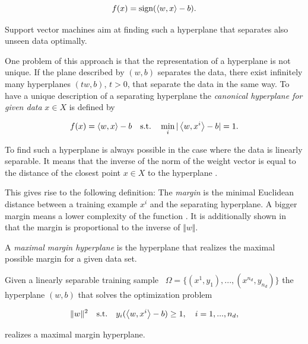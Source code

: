 \[ f(x) = \text{sign}(\left\langle w,x\right\rangle-b). \]

Support vector machines aim at finding such a hyperplane that separates also unseen data optimally.


One problem of this approach is that the representation of a hyperplane is not unique. If the plane described by \((w,b)\) separates the data, there exist infinitely many hyperplanes \((tw,b)\), \(t>0\), that separate the data in the same way.
To have a unique description of a separating hyperplane the \emph{canonical hyperplane for given data} \(x \in X\) is defined by
 
\[ f(x) = \left\langle w, x\right\rangle - b  \quad \text{s.t.} \quad \min_i \vert\left\langle w,x^i\right\rangle -b\vert = 1.\] 

To find such a hyperplane is always possible in the case where the data is  linearly separable. It means that the inverse of the norm of the weight vector is equal to the distance of the closest point \(x \in X \) to  the hyperplane \cite[p. 10]{Kunapuli2008}.



This gives rise to the following definition:
The \emph{margin} is the minimal Euclidean distance between a training example \(x^i\) and the separating hyperplane.
A bigger margin means a lower complexity of the function \cite{Cristianini2000}. It is additionally shown in \cite[p. 10]{Kunapuli2008} that the margin is proportional to the inverse of \(\Vert w \Vert\).

A \emph{maximal margin hyperplane} is the hyperplane that realizes the maximal possible margin for a given data set.

\begin{proposition}
Given a linearly separable training sample \ \(\Omega = \{(x^1,y_1),...,(x^{n_d},y_{n_d})\}\) the hyperplane \((w,b)\) that solves the optimization problem

\[\|w\|^2 \quad \text{s.t.} \quad y_i(\left\langle w,x^i\right\rangle-b)\geq 1, \quad i = 1,...,n_d, \]

realizes a maximal margin hyperplane.
\end{proposition}

